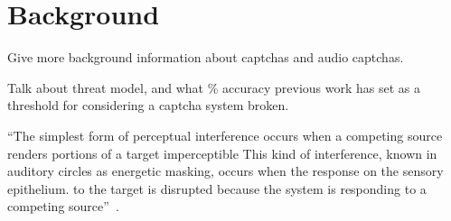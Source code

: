 \section{Background}
\label{sec:background}

Give more background information about captchas and audio captchas.

Talk about threat model, and what \% accuracy previous work has
set as a threshold for considering a captcha system broken.

``The simplest form of perceptual interference occurs when a competing source renders portions of a target imperceptible
This kind of interference, known in auditory circles as energetic masking, occurs when the response on the sensory epithelium.
to the target is disrupted because the system is responding to a competing source''~\cite{shinn2008object}.
